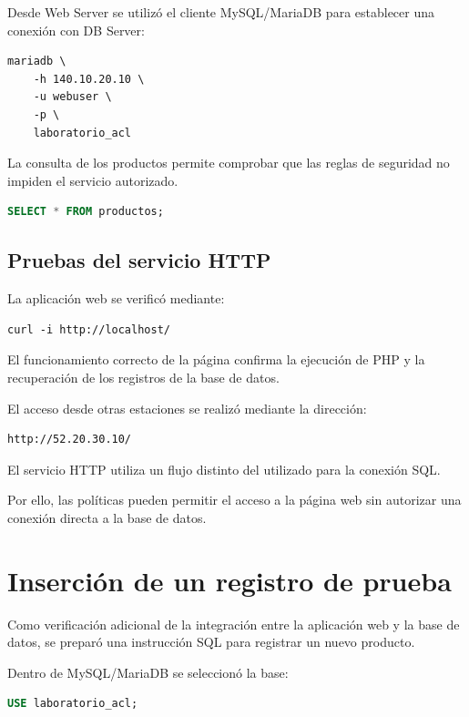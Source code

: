 \documentclass[12pt,a4paper]{article}
\begin{document}
Desde Web Server se utilizó
el cliente MySQL/MariaDB
para establecer una conexión
con DB Server:

\begin{lstlisting}
mariadb \
    -h 140.10.20.10 \
    -u webuser \
    -p \
    laboratorio_acl
\end{lstlisting}

La consulta de los productos
permite comprobar que las reglas
de seguridad no impiden
el servicio autorizado.

\begin{lstlisting}[language=SQL]
SELECT * FROM productos;
\end{lstlisting}

\subsection{Pruebas del servicio HTTP}

La aplicación web se verificó
mediante:

\begin{lstlisting}
curl -i http://localhost/
\end{lstlisting}

El funcionamiento correcto
de la página confirma
la ejecución de PHP
y la recuperación de los
registros de la base de datos.

El acceso desde otras estaciones
se realizó mediante la dirección:

\begin{lstlisting}
http://52.20.30.10/
\end{lstlisting}

El servicio HTTP
utiliza un flujo distinto
del utilizado para la conexión SQL.

Por ello, las políticas
pueden permitir el acceso
a la página web sin autorizar
una conexión directa a
la base de datos.

\section{Inserción de un registro de prueba}

Como verificación adicional
de la integración entre
la aplicación web y
la base de datos,
se preparó una instrucción
SQL para registrar un
nuevo producto.

Dentro de MySQL/MariaDB
se seleccionó la base:

\begin{lstlisting}[language=SQL]
USE laboratorio_acl;
\end{lstlisting}
\end{document}
